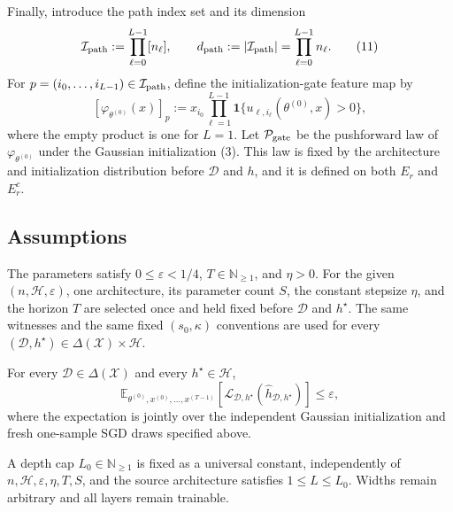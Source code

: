 Finally, introduce the path index set and its dimension
\[
\mathcal I_{\rm path}:=\prod_{\ell=0}^{L-1}[n_\ell],
\qquad
d_{\rm path}:=|\mathcal I_{\rm path}|
=\prod_{\ell=0}^{L-1}n_\ell.
\tag{11}
\]
For $p=(i_0,\ldots,i_{L-1})\in\mathcal I_{\rm path}$, define the
initialization-gate feature map by
\[
[\varphi_{\theta^{(0)}}(x)]_p
:=x_{i_0}\prod_{\ell=1}^{L-1}
\mathbf 1\{u_{\ell,i_\ell}(\theta^{(0)},x)>0\},
\tag{12}
\]
where the empty product is one for $L=1$.  Let
$\mathcal P_{\rm gate}$ be the pushforward law of
$\varphi_{\theta^{(0)}}$ under the Gaussian initialization (3).  This law is
fixed by the architecture and initialization distribution before
$\mathcal D$ and $h$, and it is defined on both $E_r$ and $E_r^c$.

\subsection{Assumptions}

\begin{assumption}
\label{assump:fixed-source-witnesses}
The parameters satisfy $0\leq\varepsilon<1/4$, $T\in\mathbb N_{\geq1}$,
and $\eta>0$.  For the given $(n,\mathcal H,\varepsilon)$, one architecture,
its parameter count $S$, the constant stepsize $\eta$, and the horizon $T$
are selected once and held fixed before $\mathcal D$ and $h^\star$.  The same
witnesses and the same fixed $(s_0,\kappa)$ conventions are used for every
$(\mathcal D,h^\star)\in\Delta(\mathcal X)\times\mathcal H$.
\end{assumption}

\begin{assumption}
\label{assump:universal-expected-success}
For every $\mathcal D\in\Delta(\mathcal X)$ and every
$h^\star\in\mathcal H$,
\[
\mathbb E_{\theta^{(0)},x^{(0)},\ldots,x^{(T-1)}}\!\left[
\mathcal L_{\mathcal D,h^\star}
(\widehat h_{\mathcal D,h^\star})
\right]\leq\varepsilon,
\tag{13}
\]
where the expectation is jointly over the independent Gaussian initialization
and fresh one-sample SGD draws specified above.
\end{assumption}

\begin{assumption}
\label{assump:constant-depth}
A depth cap $L_0\in\mathbb N_{\geq1}$ is fixed as a universal constant,
independently of $n,\mathcal H,\varepsilon,\eta,T,S$, and the source
architecture satisfies $1\leq L\leq L_0$.  Widths remain arbitrary and all
layers remain trainable.
\end{assumption}

